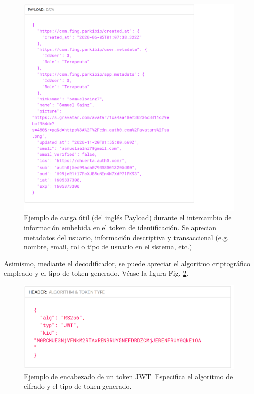 \begin{figure}[h!]
\centering
\includegraphics[width=\textwidth]{TESIS/imagenes/chap05/payload-token.PNG}
\caption{Ejemplo de carga útil (del inglés Payload) durante el intercambio de información embebida en el token de identificación. Se aprecian metadatos del usuario, información descriptiva y transaccional (e.g. nombre, email, rol o tipo de usuario en el sistema, etc.)}
\label{FIG:payload-token}
\end{figure}

Asimismo, mediante el decodificador, se puede apreciar el algoritmo criptográfico empleado y el tipo de token generado. Véase la figura Fig. \ref{FIG:header-token}.

\begin{figure}[H]
\centering
\includegraphics[width=\textwidth]{TESIS/imagenes/chap05/header-token.PNG}
\caption{Ejemplo de encabezado de un token JWT. Especifica el algoritmo de cifrado y el tipo de token generado.}
\label{FIG:header-token}
\end{figure}


